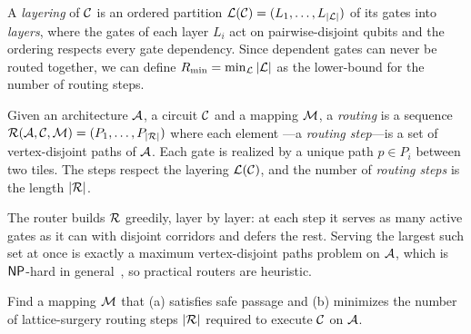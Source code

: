 \begin{definition}
\label{def:layering}
    A \emph{layering} of $\mathcal{C}$ is an ordered partition
    $\mathcal{L}(\mathcal{C})=(L_1,\dots,L_{|\mathcal{L}|})$ of its gates into \emph{layers}, where the gates
    of each layer $L_i$ act on pairwise-disjoint qubits and the ordering respects
    every gate dependency. Since dependent gates can never be routed together,
    we can define $R_{\min}=\min_{\mathcal{L}}|\mathcal{L}|$ as the lower-bound for the number of routing steps.
\end{definition}

\begin{definition}[Routing]
\label{def:routing}
    Given an architecture $\mathcal{A}$, a circuit $\mathcal{C}$ and a mapping $\mathcal{M}$, a \emph{routing} 
    is a sequence $\mathcal{R}(\mathcal{A},\mathcal{C},\mathcal{M})=(P_1,\dots,P_{|\mathcal{R}|})$ where each element
    ---a \emph{routing step}---is a set of vertex-disjoint paths of $\mathcal{A}$. Each gate is 
    realized by a unique path $p\in P_i$ between two tiles. 
    The steps respect the layering $\mathcal{L}(\mathcal{C})$, 
    and the number of \emph{routing steps} is the length $|\mathcal{R}|$.
\end{definition}

The router builds $\mathcal{R}$ greedily, layer by layer: at each step it serves as many
active gates as it can with disjoint corridors and defers the rest. Serving the
largest such set at once is exactly a maximum vertex-disjoint paths problem on
$\mathcal{A}$, which is $\mathsf{NP}$-hard in
general~\cite{beverland2022surface,siraichi2018qubit}, so practical routers are
heuristic. 

\begin{problem}
    Find a mapping $\mathcal{M}$ that (a) satisfies safe passage and (b) minimizes the number of lattice-surgery routing steps $|\mathcal{R}|$ required to execute $\mathcal{C}$ on $\mathcal{A}$.
\end{problem}
